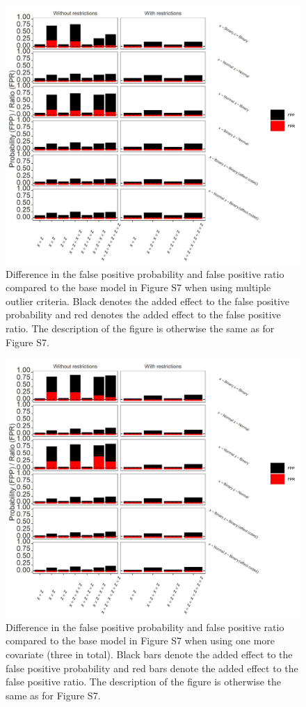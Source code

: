 \begin{figure}[hbt!]
\includegraphics{R/Analysis/Result/Figures/Figure1BSIBon.jpeg}
\centering
\caption{Difference in the false positive probability and false positive ratio compared to the base model in Figure S7 when using multiple outlier criteria. Black denotes the added effect to the false positive probability and red denotes the added effect to the false positive ratio.  The description of the figure is otherwise the same as for Figure S7.}
\label{fig:mainfigure}
\end{figure}

\begin{figure}[hbt!]
\includegraphics{R/Analysis/Result/Figures/Figure1CSIBon.jpeg}
\centering
\caption{Difference in the false positive probability and false positive ratio compared to the base model in Figure S7 when using one more covariate (three in total). Black bars denote the added effect to the false positive probability and red bars denote the added effect to the false positive ratio. The description of the figure is otherwise the same as for Figure S7.}
\label{fig:mainfigure}
\end{figure}

